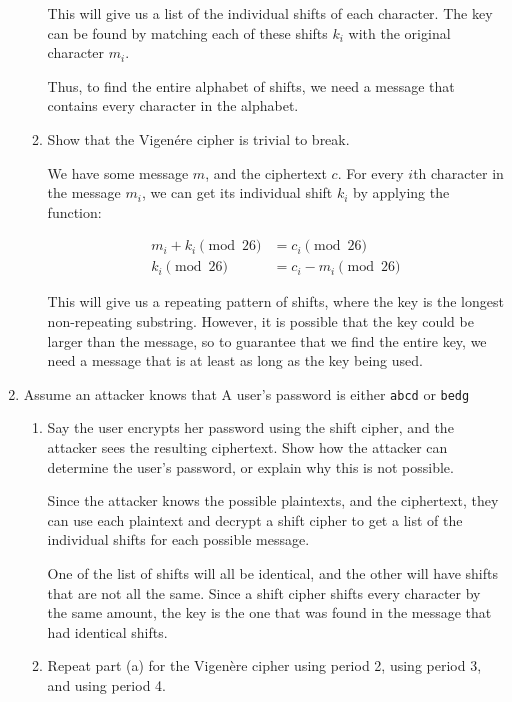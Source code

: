 \documentclass{article}
\begin{document}
\begin{enumerate}
\begin{enumerate}
        This will give us a list of the individual shifts of each character. The
        key can be found by matching each of these shifts $k_i$ with the original
        character $m_i$.

        Thus, to find the entire alphabet of shifts, we need a message that
        contains every character in the alphabet.
      \item Show that the Vigen\'ere cipher is trivial to break.

        We have some message $m$, and the ciphertext $c$. For every $i$th
        character in the message $m_i$, we can get its individual shift $k_i$ by
        applying the function:

        \begin{align*}
          m_i + k_i \pmod{26} &= c_i \pmod{26}\\
          k_i \pmod{26} &= c_i - m_i \pmod{26}
        \end{align*}

        This will give us a repeating pattern of shifts, where the key is the
        longest non-repeating substring. However, it is possible that the key
        could be larger than the message, so to guarantee that we find the
        entire key, we need a message that is at least as long as the key being
        used.
    \end{enumerate}

  \item Assume an attacker knows that A user's password is either
    \verb|abcd| or \verb|bedg|
    \begin{enumerate}
      \item Say the user encrypts her password using the shift cipher, and the 
        attacker sees the resulting ciphertext. Show how the attacker can 
        determine the user’s password, or explain why this is not possible.

        Since the attacker knows the possible plaintexts, and the ciphertext,
        they can use each plaintext and decrypt a shift cipher to get a list of
        the individual shifts for each possible message.

        One of the list of shifts will all be identical, and the other will have
        shifts that are not all the same. Since a shift cipher shifts every
        character by the same amount, the key is the one that was found in the
        message that had identical shifts.

      \item Repeat part (a) for the Vigen\`ere cipher using period 2, using 
        period 3, and using period 4.


\end{enumerate}
\end{enumerate}
\end{document}
